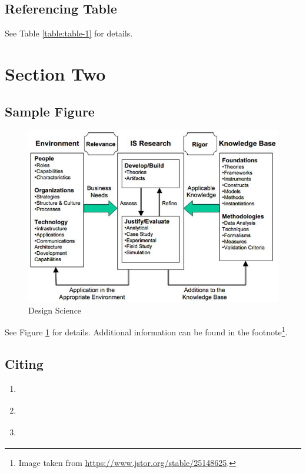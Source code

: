 \documentclass[a4paper]{article}
\begin{document}
\subsection{Referencing Table}
See Table \ref{table:table-1} for details.

\clearpage
\section{Section Two}
\subsection{Sample Figure}
\begin{figure}[htbp]
    \centering
    \includegraphics[width=.9\linewidth]{./figures/hevner.png}
    \caption{Design Science}
    \label{figure:hevner}
\end{figure}
See Figure \ref{figure:hevner} for details. Additional information can be
found in the footnote\footnote{Image taken from \url{https://www.jstor.org/stable/25148625}.}.
\subsection{Citing}

\begin{enumerate}
    \item \parencite{hevner04_desig_scien_infor_system_resear}
    \item \parencite{hevner04_desig_scien_infor_system_resear}
    \item \textcite{hevner04_desig_scien_infor_system_resear}
\end{enumerate}

\clearpage
\printbibliography
\end{document}
